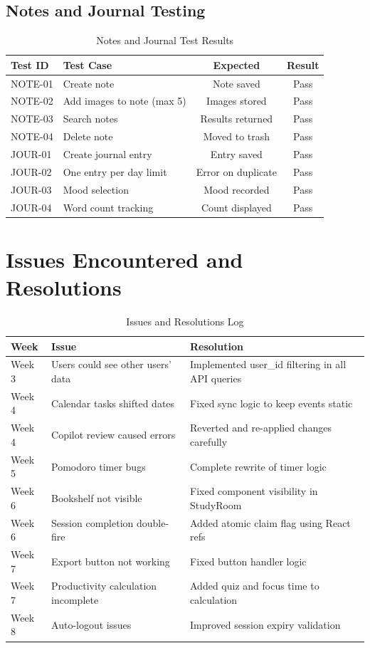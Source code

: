 \subsection{Notes and Journal Testing}
\begin{table}[H]
\centering
\begin{tabular}{|l|p{5cm}|c|c|}
\hline
\textbf{Test ID} & \textbf{Test Case} & \textbf{Expected} & \textbf{Result} \\
\hline
NOTE-01 & Create note & Note saved & Pass \\
NOTE-02 & Add images to note (max 5) & Images stored & Pass \\
NOTE-03 & Search notes & Results returned & Pass \\
NOTE-04 & Delete note & Moved to trash & Pass \\
JOUR-01 & Create journal entry & Entry saved & Pass \\
JOUR-02 & One entry per day limit & Error on duplicate & Pass \\
JOUR-03 & Mood selection & Mood recorded & Pass \\
JOUR-04 & Word count tracking & Count displayed & Pass \\
\hline
\end{tabular}
\caption{Notes and Journal Test Results}
\end{table}

\newpage
\section{Issues Encountered and Resolutions}

\begin{table}[h]
\centering
\small
\begin{tabular}{|l|p{4cm}|p{5cm}|}
\hline
\textbf{Week} & \textbf{Issue} & \textbf{Resolution} \\
\hline
Week 3 & Users could see other users' data & Implemented user\_id filtering in all API queries \\
\hline
Week 4 & Calendar tasks shifted dates & Fixed sync logic to keep events static \\
\hline
Week 4 & Copilot review caused errors & Reverted and re-applied changes carefully \\
\hline
Week 5 & Pomodoro timer bugs & Complete rewrite of timer logic \\
\hline
Week 6 & Bookshelf not visible & Fixed component visibility in StudyRoom \\
\hline
Week 6 & Session completion double-fire & Added atomic claim flag using React refs \\
\hline
Week 7 & Export button not working & Fixed button handler logic \\
\hline
Week 7 & Productivity calculation incomplete & Added quiz and focus time to calculation \\
\hline
Week 8 & Auto-logout issues & Improved session expiry validation \\
\hline
\end{tabular}
\caption{Issues and Resolutions Log}
\end{table}

